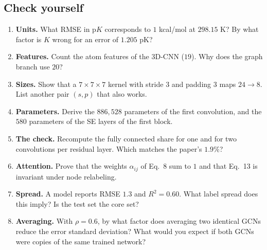\documentclass[11pt]{article}
\newcommand{\pK}{\mathrm{p}K}
\begin{document}
\subsection*{Check yourself}
\begin{enumerate}
  \item \textbf{Units.} What RMSE in $\pK$ corresponds to $1$ kcal/mol at $298.15$ K? By what factor is $K$ wrong for an error of $1.205$ pK?
  \item \textbf{Features.} Count the atom features of the 3D-CNN ($19$). Why does the graph branch use $20$?
  \item \textbf{Sizes.} Show that a $7\times7\times7$ kernel with stride $3$ and padding $3$ maps $24\to8$. List another pair $(s,p)$ that also works.
  \item \textbf{Parameters.} Derive the $886{,}528$ parameters of the first convolution, and the $580$ parameters of the SE layers of the first block.
  \item \textbf{The check.} Recompute the fully connected share for one and for two convolutions per residual layer. Which matches the paper's $1.9\%$?
  \item \textbf{Attention.} Prove that the weights $\alpha_{ij}$ of Eq.~8 sum to $1$ and that Eq.~13 is invariant under node relabeling.
  \item \textbf{Spread.} A model reports RMSE $1.3$ and $R^2=0.60$. What label spread does this imply? Is the test set the core set?
  \item \textbf{Averaging.} With $\rho=0.6$, by what factor does averaging two identical GCNs reduce the error standard deviation? What would you expect if both GCNs were copies of the same trained network?
\end{enumerate}
\end{document}
